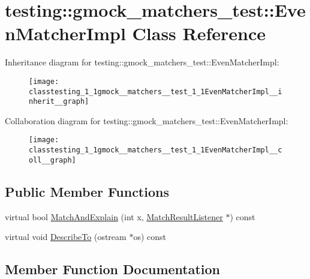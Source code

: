 \hypertarget{classtesting_1_1gmock__matchers__test_1_1EvenMatcherImpl}{}\section{testing\+:\+:gmock\+\_\+matchers\+\_\+test\+:\+:Even\+Matcher\+Impl Class Reference}
\label{classtesting_1_1gmock__matchers__test_1_1EvenMatcherImpl}


Inheritance diagram for testing\+:\+:gmock\+\_\+matchers\+\_\+test\+:\+:Even\+Matcher\+Impl\+:\nopagebreak
\begin{figure}[H]
\begin{center}
\leavevmode
\texttt{[image: classtesting\_1\_1gmock\_\_matchers\_\_test\_1\_1EvenMatcherImpl\_\_inherit\_\_graph]}
\end{center}
\end{figure}


Collaboration diagram for testing\+:\+:gmock\+\_\+matchers\+\_\+test\+:\+:Even\+Matcher\+Impl\+:\nopagebreak
\begin{figure}[H]
\begin{center}
\leavevmode
\texttt{[image: classtesting\_1\_1gmock\_\_matchers\_\_test\_1\_1EvenMatcherImpl\_\_coll\_\_graph]}
\end{center}
\end{figure}
\subsection*{Public Member Functions}
\begin{DoxyCompactItemize}
\item 
virtual bool \hyperlink{classtesting_1_1gmock__matchers__test_1_1EvenMatcherImpl_a91bd69693562946f5a11157ae1cc0e5c}{Match\+And\+Explain} (int x, \hyperlink{classtesting_1_1MatchResultListener}{Match\+Result\+Listener} $\ast$) const 
\item 
virtual void \hyperlink{classtesting_1_1gmock__matchers__test_1_1EvenMatcherImpl_aa29ca9bfd5c704cba3bde3a1997d74f8}{Describe\+To} (ostream $\ast$os) const 
\end{DoxyCompactItemize}


\subsection{Member Function Documentation}
